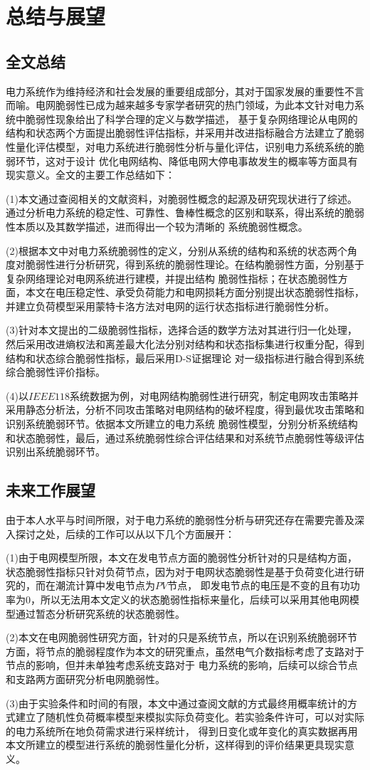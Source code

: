 \chapter{总结与展望}
\label{cha:summery}

\section{全文总结}
\label{sec:sum}
电力系统作为维持经济和社会发展的重要组成部分，其对于国家发展的重要性不言而喻。电网脆弱性已成为越来越多专家学者研究的热门领域，为此本文针对电力系统中脆弱性现象给出了科学合理的定义与数学描述，
基于复杂网络理论从电网的结构和状态两个方面提出脆弱性评估指标，并采用并改进指标融合方法建立了脆弱性量化评估模型，对电力系统进行脆弱性分析与量化评估，识别电力系统系统的脆弱环节，这对于设计
优化电网结构、降低电网大停电事故发生的概率等方面具有现实意义。全文的主要工作总结如下：

(1)本文通过查阅相关的文献资料，对脆弱性概念的起源及研究现状进行了综述。通过分析电力系统的稳定性、可靠性、鲁棒性概念的区别和联系，得出系统的脆弱性本质以及其数学描述，进而得出一个较为清晰的
系统脆弱性概念。

(2)根据本文中对电力系统脆弱性的定义，分别从系统的结构和系统的状态两个角度对脆弱性进行分析研究，得到系统的脆弱性理论。在结构脆弱性方面，分别基于复杂网络理论对电网系统进行建模，并提出结构
脆弱性指标；在状态脆弱性方面，本文在电压稳定性、承受负荷能力和电网损耗方面分别提出状态脆弱性指标，并建立负荷模型采用蒙特卡洛方法对电网的运行状态指标进行脆弱性分析。

(3)针对本文提出的二级脆弱性指标，选择合适的数学方法对其进行归一化处理，然后采用改进熵权法和离差最大化法分别对结构和状态指标集进行权重分配，得到结构和状态综合脆弱性指标，最后采用D-S证据理论
对一级指标进行融合得到系统综合脆弱性评价指标。

(4)以$IEEE118$系统数据为例，对电网结构脆弱性进行研究，制定电网攻击策略并采用静态分析法，分析不同攻击策略对电网结构的破坏程度，得到最优攻击策略和识别系统脆弱环节。依据本文所建立的电力系统
脆弱性模型，分别分析系统结构和状态脆弱性，最后，通过系统脆弱性综合评估结果和对系统节点脆弱性等级评估识别出系统脆弱环节。

\section{未来工作展望}
\label{sec:feature}
由于本人水平与时间所限，对于电力系统的脆弱性分析与研究还存在需要完善及深入探讨之处，后续的工作可以从以下几个方面展开：

(1)由于电网模型所限，本文在发电节点方面的脆弱性分析针对的只是结构方面，状态脆弱性指标只针对负荷节点，因为对于电网状态脆弱性是基于负荷变化进行研究的，而在潮流计算中发电节点为$PV$节点，
即发电节点的电压是不变的且有功功率为0，所以无法用本文定义的状态脆弱性指标来量化，后续可以采用其他电网模型通过暂态分析研究系统的状态脆弱性。

(2)本文在电网脆弱性研究方面，针对的只是系统节点，所以在识别系统脆弱环节方面，将节点的脆弱程度作为本文的研究重点，虽然电气介数指标考虑了支路对于节点的影响，但并未单独考虑系统支路对于
电力系统的影响，后续可以综合节点和支路两方面研究分析电网脆弱性。

(3)由于实验条件和时间的有限，本文中通过查阅文献的方式最终用概率统计的方式建立了随机性负荷概率模型来模拟实际负荷变化。若实验条件许可，可以对实际的电力系统所在地负荷需求进行采样统计，
得到日变化或年变化的真实数据再用本文所建立的模型进行系统的脆弱性量化分析，这样得到的评价结果更具现实意义。

